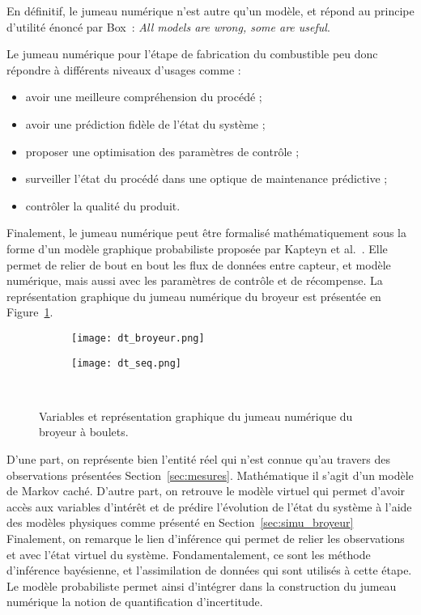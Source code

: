 En définitif, le jumeau numérique n'est autre qu'un modèle, et répond au principe d'utilité énoncé par Box~\cite{box1979}: \textit{All models are wrong, some are useful}.

Le jumeau numérique pour l'étape de fabrication du combustible peu donc répondre à différents niveaux d'usages comme :
\begin{itemize}
    \item avoir une meilleure compréhension du procédé ;
    \item avoir une prédiction fidèle de l'état du système ;
    \item proposer une optimisation des paramètres de contrôle ;
    \item surveiller l'état du procédé dans une optique de maintenance prédictive ;
    \item contrôler la qualité du produit.
\end{itemize}

Finalement, le jumeau numérique peut être formalisé mathématiquement sous la forme d'un modèle graphique probabiliste proposée par Kapteyn et al.~\cite{kapteyn_probabilistic_2021}.
Elle permet de relier de bout en bout les flux de données entre capteur, et modèle numérique, mais aussi avec les paramètres de contrôle et de récompense. La représentation graphique du jumeau numérique du broyeur est présentée en Figure~\ref{fig:graph_dt}.

\begin{figure}
    \centering
    \begin{subfigure}{0.44\textwidth}
        \texttt{[image: dt\_broyeur.png]}
    \end{subfigure}
    \hfill
    \begin{subfigure}{0.55\textwidth}
        \texttt{[image: dt\_seq.png]}
    \end{subfigure}
    \caption{Variables et représentation graphique du jumeau numérique du broyeur à boulets.}~\label{fig:graph_dt}
\end{figure}

D'une part, on représente bien l'entité réel qui n'est connue qu'au travers des observations présentées Section~\ref{sec:mesures}. Mathématique il s'agit d'un modèle de Markov caché. D'autre part, on retrouve le modèle virtuel qui permet d'avoir accès aux variables d'intérêt et de prédire l'évolution de l'état du système à l'aide des modèles physiques comme présenté en Section~\ref{sec:simu_broyeur}
Finalement, on remarque le lien d'inférence qui permet de relier les observations et avec l'état virtuel du système. Fondamentalement, ce sont les méthode d'inférence bayésienne, et l'assimilation de données qui sont utilisés à cette étape.
Le modèle probabiliste permet ainsi d'intégrer dans la construction du jumeau numérique la notion de quantification d'incertitude.

